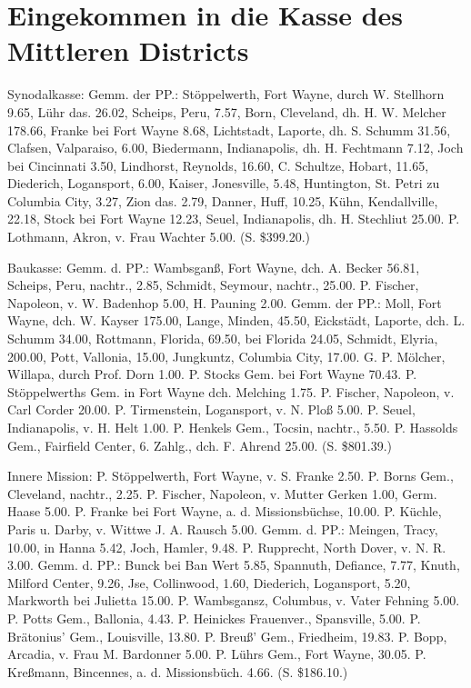 \chapter[Kasse des Mittleren Districts]{Eingekommen in die Kasse des Mittleren Districts}

Synodalkasse: Gemm. der PP.: Stöppelwerth, Fort Wayne, durch W. Stellhorn 9.65, Lühr das. 26.02, Scheips, Peru, 7.57, Born, Cleveland, dh. H. W. Melcher 178.66, Franke bei Fort Wayne 8.68, Lichtstadt, Laporte, dh. S. Schumm 31.56, Clafsen, Valparaiso, 6.00, Biedermann, Indianapolis, dh. H. Fechtmann 7.12, Joch bei Cincinnati 3.50, Lindhorst, Reynolds, 16.60, C. Schultze, Hobart, 11.65, Diederich, Logansport, 6.00, Kaiser, Jonesville, 5.48, Huntington, St. Petri zu Columbia City, 3.27, Zion das. 2.79, Danner, Huff, 10.25, Kühn, Kendallville, 22.18, Stock bei Fort Wayne 12.23, Seuel, Indianapolis, dh. H. Stechliut 25.00. P. Lothmann, Akron, v. Frau Wachter 5.00. (S. \$399.20.)

Baukasse: Gemm. d. PP.: Wambsganß, Fort Wayne, dch. A. Becker 56.81, Scheips, Peru, nachtr., 2.85, Schmidt, Seymour, nachtr., 25.00. P. Fischer, Napoleon, v. W. Badenhop 5.00, H. Pauning 2.00. Gemm. der PP.: Moll, Fort Wayne, dch. W. Kayser 175.00, Lange, Minden, 45.50, Eickstädt, Laporte, dch. L. Schumm 34.00, Rottmann, Florida, 69.50, bei Florida 24.05, Schmidt, Elyria, 200.00, Pott, Vallonia, 15.00, Jungkuntz, Columbia City, 17.00. G. P. Mölcher, Willapa, durch Prof. Dorn 1.00. P. Stocks Gem. bei Fort Wayne 70.43. P. Stöppelwerths Gem. in Fort Wayne dch. Melching 1.75. P. Fischer, Napoleon, v. Carl Corder 20.00. P. Tirmenstein, Logansport, v. N. Ploß 5.00. P. Seuel, Indianapolis, v. H. Helt 1.00. P. Henkels Gem., Tocsin, nachtr., 5.50. P. Hassolds Gem., Fairfield Center, 6. Zahlg., dch. F. Ahrend 25.00. (S. \$801.39.)

Innere Mission: P. Stöppelwerth, Fort Wayne, v. S. Franke 2.50. P. Borns Gem., Cleveland, nachtr., 2.25. P. Fischer, Napoleon, v. Mutter Gerken 1.00, Germ. Haase 5.00. P. Franke bei Fort Wayne, a. d. Missionsbüchse, 10.00. P. Küchle, Paris u. Darby, v. Wittwe J. A. Rausch 5.00. Gemm. d. PP.: Meingen, Tracy, 10.00, in Hanna 5.42, Joch, Hamler, 9.48. P. Rupprecht, North Dover, v. N. R. 3.00. Gemm. d. PP.: Bunck bei Ban Wert 5.85, Spannuth, Defiance, 7.77, Knuth, Milford Center, 9.26, Jse, Collinwood, 1.60, Diederich, Logansport, 5.20, Markworth bei Julietta 15.00. P. Wambsgansz, Columbus, v. Vater Fehning 5.00. P. Potts Gem., Ballonia, 4.43. P. Heinickes Frauenver., Spansville, 5.00. P. Brätonius’ Gem., Louisville, 13.80. P. Breuß’ Gem., Friedheim, 19.83. P. Bopp, Arcadia, v. Frau M. Bardonner 5.00. P. Lührs Gem., Fort Wayne, 30.05. P. Kreßmann, Bincennes, a. d. Missionsbüch. 4.66. (S. \$186.10.)

